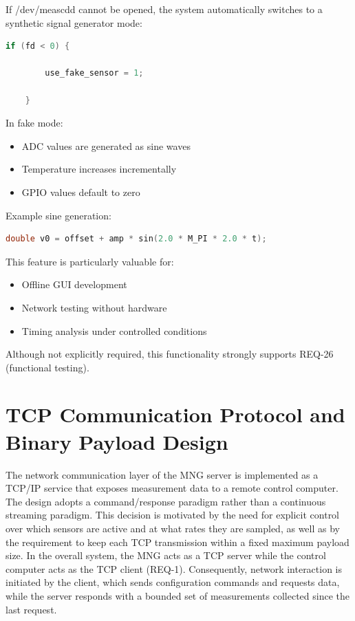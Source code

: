 If /dev/meascdd cannot be opened, the system automatically switches to a synthetic signal generator mode:

\begin{lstlisting}[language=C]
	if (fd < 0) {
		
		use_fake_sensor = 1;
		
	}
\end{lstlisting}

In fake mode:

\begin{itemize}
	\item ADC values are generated as sine waves
	\item Temperature increases incrementally
	\item GPIO values default to zero
\end{itemize}

Example sine generation:

\begin{lstlisting}[language=C]
	double v0 = offset + amp * sin(2.0 * M_PI * 2.0 * t);
\end{lstlisting}

This feature is particularly valuable for:

\begin{itemize}
	\item Offline GUI development
	\item Network testing without hardware
	\item Timing analysis under controlled conditions
\end{itemize}

Although not explicitly required, this functionality strongly supports REQ-26 (functional testing).

\section{TCP Communication Protocol and Binary Payload Design}

The network communication layer of the MNG server is implemented as a TCP/IP service that exposes measurement data to a remote control computer. The design adopts a command/response paradigm rather than a continuous streaming paradigm. This decision is motivated by the need for explicit control over which sensors are active and at what rates they are sampled, as well as by the requirement to keep each TCP transmission within a fixed maximum payload size. In the overall system, the MNG acts as a TCP server while the control computer acts as the TCP client (REQ-1). Consequently, network interaction is initiated by the client, which sends configuration commands and requests data, while the server responds with a bounded set of measurements collected since the last request.

